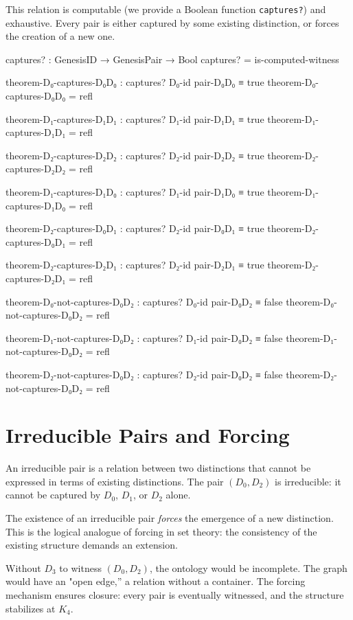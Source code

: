 \documentclass[11pt,a4paper]{book}
\begin{document}
This relation is computable (we provide a Boolean function \texttt{captures?}) and exhaustive.
Every pair is either captured by some existing distinction, or forces the creation of a new one.

\begin{code}
captures? : GenesisID → GenesisPair → Bool
captures? = is-computed-witness

theorem-D₀-captures-D₀D₀ : captures? D₀-id pair-D₀D₀ ≡ true
theorem-D₀-captures-D₀D₀ = refl

theorem-D₁-captures-D₁D₁ : captures? D₁-id pair-D₁D₁ ≡ true
theorem-D₁-captures-D₁D₁ = refl

theorem-D₂-captures-D₂D₂ : captures? D₂-id pair-D₂D₂ ≡ true
theorem-D₂-captures-D₂D₂ = refl

theorem-D₁-captures-D₁D₀ : captures? D₁-id pair-D₁D₀ ≡ true
theorem-D₁-captures-D₁D₀ = refl

theorem-D₂-captures-D₀D₁ : captures? D₂-id pair-D₀D₁ ≡ true
theorem-D₂-captures-D₀D₁ = refl

theorem-D₂-captures-D₂D₁ : captures? D₂-id pair-D₂D₁ ≡ true
theorem-D₂-captures-D₂D₁ = refl

theorem-D₀-not-captures-D₀D₂ : captures? D₀-id pair-D₀D₂ ≡ false
theorem-D₀-not-captures-D₀D₂ = refl

theorem-D₁-not-captures-D₀D₂ : captures? D₁-id pair-D₀D₂ ≡ false
theorem-D₁-not-captures-D₀D₂ = refl

theorem-D₂-not-captures-D₀D₂ : captures? D₂-id pair-D₀D₂ ≡ false
theorem-D₂-not-captures-D₀D₂ = refl
\end{code}

\section{Irreducible Pairs and Forcing}

An irreducible pair is a relation between two distinctions that cannot be expressed in terms of existing distinctions.
The pair $(D_0, D_2)$ is irreducible: it cannot be captured by $D_0$, $D_1$, or $D_2$ alone.

The existence of an irreducible pair \emph{forces} the emergence of a new distinction.
This is the logical analogue of forcing in set theory: the consistency of the existing structure demands an extension.

Without $D_3$ to witness $(D_0, D_2)$, the ontology would be incomplete.
The graph would have an "open edge,'' a relation without a container.
The forcing mechanism ensures closure: every pair is eventually witnessed, and the structure stabilizes at $K_4$.
\end{document}
